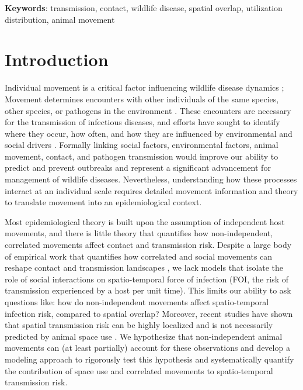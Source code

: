 \documentclass[letterpaper]{article}
\begin{document}
\bigskip
\noindent
\textbf{Keywords}: transmission, contact, wildlife disease, spatial overlap, utilization distribution, animal movement

\section*{Introduction}

Individual movement is a critical factor influencing wildlife disease dynamics \citep{Dougherty2018,Manlove2022};
Movement determines encounters with other individuals of the same species, other species, or pathogens in the environment \citep{Martinez-Garcia2020,Das2023}. 
These encounters are necessary for the transmission of infectious diseases, and efforts have sought to identify where they occur, how often, and how they are influenced by environmental and social drivers \citep{Titcomb2021,Dougherty2022,Webber2023}. 
Formally linking social factors, environmental factors, animal movement, contact, and pathogen transmission would improve our ability to predict and prevent outbreaks and represent a significant advancement for management of wildlife diseases.  
Nevertheless, understanding how these processes interact at an individual scale requires detailed movement information and theory to translate movement into an epidemiological context.

Most epidemiological theory is built upon the assumption of independent host movements, and there is little theory that quantifies how non-independent, correlated movements affect contact and transmission risk. Despite a large body of empirical work that quantifies how correlated and social movements can reshape contact and transmission landscapes \citep[e.g.,][]{Kjaer2008,Grear2010,Schauber2015a}, we lack models that isolate the role of social interactions on spatio-temporal force of infection (FOI, the risk of transmission experienced by a host per unit time). This limits our ability to ask questions like: how do non-independent movements affect spatio-temporal infection risk, compared to spatial overlap?  Moreover, recent studies have shown that spatial transmission risk can be highly localized \citep{Albery2021} and is not necessarily predicted by animal space use \citep{Yang2023a}. We hypothesize that non-independent animal movements can (at least partially) account for these observations and develop a modeling approach to rigorously test this hypothesis and systematically quantify the contribution of space use and correlated movements to spatio-temporal transmission risk.
\end{document}
